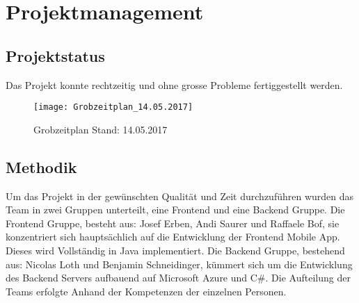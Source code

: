 \section{Projektmanagement}\label{projektmanagement}
\subsection{Projektstatus}\label{projektstatus}
Das Projekt konnte rechtzeitig und ohne grosse Probleme fertiggestellt werden.

\begin{figure}
  \centering
  \texttt{[image: Grobzeitplan\_14.05.2017]}
  \caption{Grobzeitplan Stand: 14.05.2017}
\end{figure}

\subsection{Methodik}
Um das Projekt in der gewünschten Qualität und Zeit durchzuführen wurden das Team in zwei Gruppen unterteilt, eine Frontend und eine Backend Gruppe.
Die Frontend Gruppe, besteht aus: Josef Erben, Andi Saurer und Raffaele Bof, sie konzentriert sich hauptsächlich auf die Entwicklung der Frontend Mobile App. Dieses wird Vollständig in Java implementiert.
Die Backend Gruppe, bestehend aus: Nicolas Loth und Benjamin Schneidinger, kümmert sich um die Entwicklung des Backend Servers aufbauend auf Microsoft Azure und C#.
Die Aufteilung der Teams erfolgte Anhand der Kompetenzen der einzelnen Personen.


